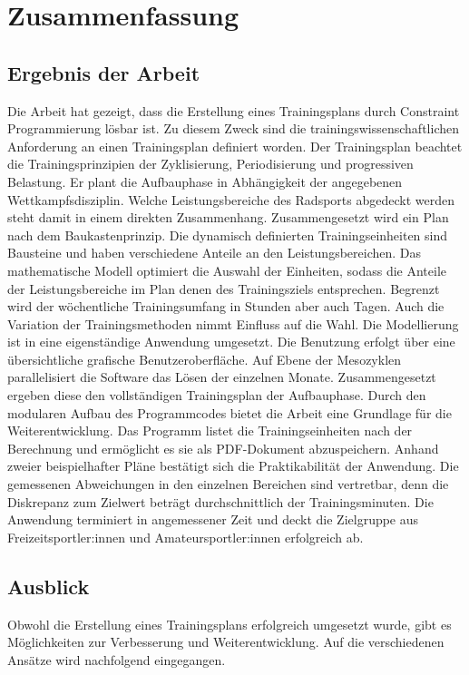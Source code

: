 \chapter{Zusammenfassung}
\label{sec:zusammenfassung}
\section{Ergebnis der Arbeit}
\label{sec:zusammenfassung:ergebnis}
Die Arbeit hat gezeigt, dass die Erstellung eines Trainingsplans durch Constraint Programmierung lösbar ist. Zu diesem Zweck sind die trainingswissenschaftlichen Anforderung an einen Trainingsplan definiert worden. Der Trainingsplan beachtet die Trainingsprinzipien der Zyklisierung, Periodisierung und progressiven Belastung. Er plant die Aufbauphase in Abhängigkeit der angegebenen Wettkampfsdisziplin. Welche Leistungsbereiche des Radsports abgedeckt werden steht damit in einem direkten Zusammenhang.\newline 
Zusammengesetzt wird ein Plan nach dem Baukastenprinzip. Die dynamisch definierten Trainingseinheiten sind Bausteine und haben verschiedene Anteile an den Leistungsbereichen. Das mathematische Modell optimiert die Auswahl der Einheiten, sodass die Anteile der Leistungsbereiche im Plan denen des Trainingsziels entsprechen. Begrenzt wird der wöchentliche Trainingsumfang in Stunden aber auch Tagen. Auch die Variation der Trainingsmethoden nimmt Einfluss auf die Wahl.\newline
Die Modellierung ist in eine eigenständige Anwendung umgesetzt. Die Benutzung erfolgt über eine übersichtliche grafische Benutzeroberfläche. Auf Ebene der Mesozyklen parallelisiert die Software das Lösen der einzelnen Monate. Zusammengesetzt ergeben diese den vollständigen Trainingsplan der Aufbauphase. Durch den modularen Aufbau des Programmcodes bietet die Arbeit eine Grundlage für die Weiterentwicklung. Das Programm listet die Trainingseinheiten nach der Berechnung und ermöglicht es sie als PDF-Dokument abzuspeichern.\newline
Anhand zweier beispielhafter Pläne bestätigt sich die Praktikabilität der Anwendung. Die gemessenen Abweichungen in den einzelnen Bereichen sind vertretbar, denn die Diskrepanz zum Zielwert beträgt durchschnittlich  der Trainingsminuten. Die Anwendung terminiert in angemessener Zeit und deckt die Zielgruppe aus Freizeitsportler:innen und Amateursportler:innen erfolgreich ab.

\section{Ausblick}
\label{sec:zusammenfassung:ausblick}
Obwohl die Erstellung eines Trainingsplans erfolgreich umgesetzt wurde, gibt es Möglichkeiten zur Verbesserung und Weiterentwicklung. Auf die verschiedenen Ansätze wird nachfolgend eingegangen.

